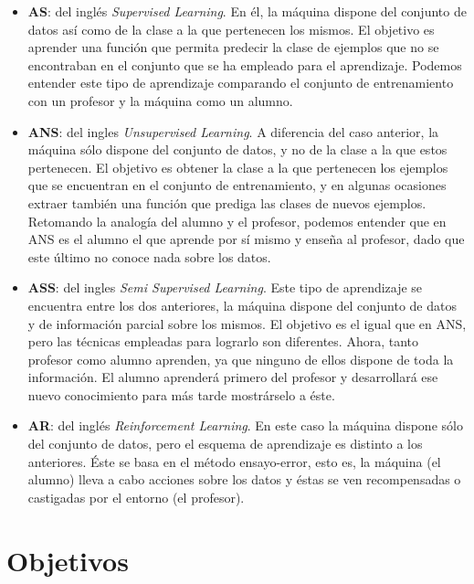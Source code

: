 \begin{itemize}
	
	\item \textbf{\acf{AS}}: del inglés \textit{Supervised Learning}. En él, la máquina dispone del conjunto de datos así como de la clase a la que pertenecen los mismos. El objetivo es aprender una función que permita predecir la clase de ejemplos que no se encontraban en el conjunto que se ha empleado para el aprendizaje. Podemos entender este tipo de aprendizaje comparando el conjunto de entrenamiento con un profesor y la máquina como un alumno.
	
	\item \textbf{\acf{ANS}}: del ingles \textit{Unsupervised Learning}. A diferencia del caso anterior, la máquina sólo dispone del conjunto de datos, y no de la clase a la que estos pertenecen. El objetivo es obtener la clase a la que pertenecen los ejemplos que se encuentran en el conjunto de entrenamiento, y en algunas ocasiones extraer también una función que prediga las clases de nuevos ejemplos. Retomando la analogía del alumno y el profesor, podemos entender que en \acs{ANS} es el alumno el que aprende por sí mismo y enseña al profesor, dado que este último no conoce nada sobre los datos.
	
	\item \textbf{\acf{ASS}}: del ingles \textit{Semi Supervised Learning}. Este tipo de aprendizaje se encuentra entre los dos anteriores, la máquina dispone del conjunto de datos y de información parcial sobre los mismos. El objetivo es el igual que en \acs{ANS}, pero las técnicas empleadas para lograrlo son diferentes. Ahora, tanto profesor como alumno aprenden, ya que ninguno de ellos dispone de toda la información. El alumno aprenderá primero del profesor y desarrollará ese nuevo conocimiento para más tarde mostrárselo a éste.
	
	\item \textbf{\acf{AR}}: del inglés \textit{Reinforcement Learning}. En este caso la máquina dispone sólo del conjunto de datos, pero el esquema de aprendizaje es distinto a los anteriores. Éste se basa en el método ensayo-error, esto es, la máquina (el alumno) lleva a cabo acciones sobre los datos y éstas se ven recompensadas o castigadas por el entorno (el profesor).
	
\end{itemize}

\section{Objetivos}


